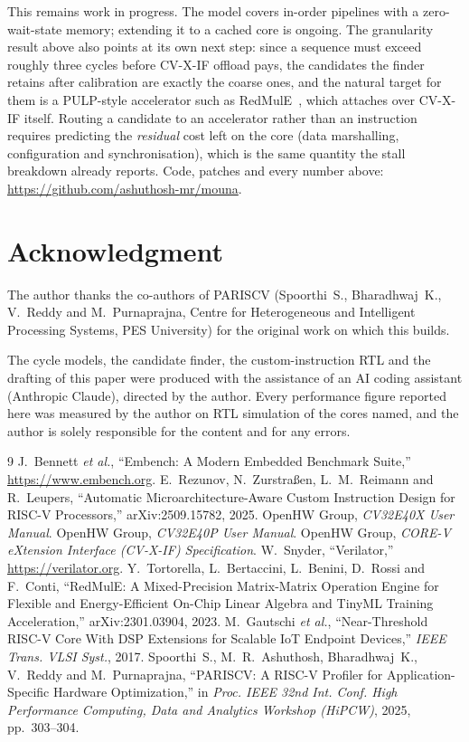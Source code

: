 \documentclass[conference,10pt]{IEEEtran}
\begin{document}
This remains work in progress. The model covers in-order pipelines with a
zero-wait-state memory; extending it to a cached core is ongoing. The
granularity result above also points at its own next step: since a sequence must
exceed roughly three cycles before CV-X-IF offload pays, the candidates the
finder retains after calibration are exactly the coarse ones, and the natural
target for them is a PULP-style accelerator such as RedMulE~\cite{redmule},
which attaches over CV-X-IF itself. Routing a candidate to an accelerator rather
than an instruction requires predicting the \emph{residual} cost left on the
core (data marshalling, configuration and synchronisation), which is the same
quantity the stall breakdown already reports. Code, patches and every number
above: \url{https://github.com/ashuthosh-mr/mouna}.

\section*{Acknowledgment}

The author thanks the co-authors of PARISCV (Spoorthi~S., Bharadhwaj~K.,
V.~Reddy and M.~Purnaprajna, Centre for Heterogeneous and Intelligent Processing
Systems, PES University) for the original work on which this builds.

The cycle models, the candidate finder, the custom-instruction RTL and the
drafting of this paper were produced with the assistance of an AI coding
assistant (Anthropic Claude), directed by the author. Every performance figure
reported here was measured by the author on RTL simulation of the cores named,
and the author is solely responsible for the content and for any errors.

\balance
\begin{thebibliography}{9}
\small
{} J.~Bennett \emph{et al.}, ``Embench: A Modern Embedded
Benchmark Suite,'' \url{https://www.embench.org}.
 E.~Rezunov, N.~Zurstra{\ss}en, L.~M.~Reimann and R.~Leupers,
``Automatic Microarchitecture-Aware Custom Instruction Design for RISC-V
Processors,'' arXiv:2509.15782, 2025.
 OpenHW Group, \emph{CV32E40X User Manual}.
 OpenHW Group, \emph{CV32E40P User Manual}.
 OpenHW Group, \emph{CORE-V eXtension Interface (CV-X-IF)
Specification}.
 W.~Snyder, ``Verilator,'' \url{https://verilator.org}.
 Y.~Tortorella, L.~Bertaccini, L.~Benini, D.~Rossi and
F.~Conti, ``RedMulE: A Mixed-Precision Matrix-Matrix Operation Engine for
Flexible and Energy-Efficient On-Chip Linear Algebra and TinyML Training
Acceleration,'' arXiv:2301.03904, 2023.
 M.~Gautschi \emph{et al.}, ``Near-Threshold RISC-V Core With
DSP Extensions for Scalable IoT Endpoint Devices,'' \emph{IEEE Trans. VLSI
Syst.}, 2017.
 Spoorthi~S., M.~R.~Ashuthosh, Bharadhwaj~K., V.~Reddy and
M.~Purnaprajna, ``PARISCV: A RISC-V Profiler for Application-Specific Hardware
Optimization,'' in \emph{Proc. IEEE 32nd Int. Conf. High Performance Computing,
Data and Analytics Workshop (HiPCW)}, 2025, pp.~303--304.
\end{thebibliography}
\end{document}
